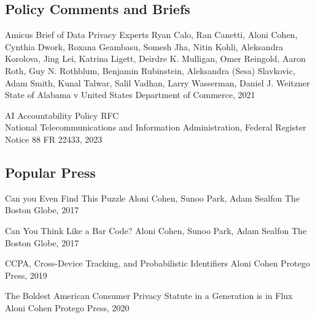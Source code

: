 \subsection{Policy Comments and Briefs}
  \begin{itemize}[label={}]


  
\cvpub%
{Amicus Brief of Data Privacy Experts}%
{Ryan Calo, Ran Canetti, Aloni Cohen, Cynthia Dwork, Roxana Geambasu, Somesh Jha, Nitin Kohli, Aleksandra Korolova, Jing Lei, Katrina Ligett, Deirdre K. Mulligan, Omer Reingold, Aaron Roth, Guy N. Rothblum, Benjamin Rubinstein, Aleksandra (Sesa) Slavkovic, Adam Smith, Kunal Talwar, Salil Vadhan, Larry Wasserman, Daniel J. Weitzner}%
{State of Alabama v United States Department of Commerce, 2021}%
{}


%
{AI Accountability Policy RFC\\}%
{National Telecommunications and Information Administration, Federal Register Notice 88 FR 22433, 2023}%

\end{itemize}



\subsection{Popular Press}

  \begin{itemize}[label={}]

\cvpubinline%
{Can you Even Find This Puzzle}%
{Aloni Cohen, Sunoo Park, Adam Sealfon}%
{The Boston Globe, 2017}

\cvpubinline%
{Can You Think Like a Bar Code?}%
{Aloni Cohen, Sunoo Park, Adam Sealfon}%
{The Boston Globe, 2017}

\cvpubinline%
{CCPA, Cross-Device Tracking, and Probabilistic Identifiers}%
{Aloni Cohen}%
{Protego Press, 2019}

\cvpubinline%
{The Boldest American Consumer Privacy Statute in a Generation is in Flux}%
{Aloni Cohen}%
{Protego Press, 2020}


  \end{itemize}
